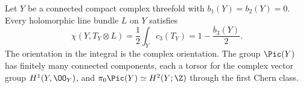 \begin{proposition}\label{cdp:st:C.1.1}
Let $Y$ be a connected compact complex threefold with
$b_1(Y)=b_2(Y)=0$. Every holomorphic line bundle $L$ on $Y$ satisfies
\[
 \chi(Y,T_Y\otimes L)=\frac12\int_Yc_3(T_Y)
 =1-\frac{b_3(Y)}2.
\]
The orientation in the integral is the complex orientation. The group
$\Pic(Y)$ has finitely many connected components, each a torsor for the
complex vector group $H^1(Y,\OO_Y)$, and
$\pi_0\Pic(Y)\simeq H^2(Y;\Z)$ through the first Chern class.
\end{proposition}


